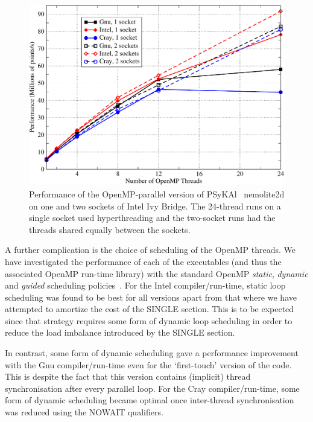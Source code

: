 \documentclass[journal]{IEEEtran}
\newlength{\picwidth}
\newcommand{\psykal}{{PS}y{KA}l\ }
\begin{document}
\begin{figure}
\centering
\includegraphics[width=\picwidth]{1and2sockets}
\caption{Performance of the OpenMP-parallel version of \psykal
  nemolite2d on one and two sockets of Intel Ivy Bridge. The 24-thread
  runs on a single socket used hyperthreading and the two-socket runs
  had the threads shared equally between the sockets.}
\label{FIG_omp_2socks}
\end{figure}

A further complication is the choice of scheduling of the OpenMP
threads.  We have investigated the performance of each of the
executables (and thus the associated OpenMP run-time library) with the
standard OpenMP {\it static}, {\it dynamic} and {\it guided}
scheduling policies~\cite{openmp_standard}. For the Intel
compiler/run-time, static loop scheduling was found to be best for all
versions apart from that where we have attempted to amortize the cost
of the SINGLE section. This is to be expected since that strategy
requires some form of dynamic loop scheduling in order to reduce the
load imbalance introduced by the SINGLE section.

In contrast, some form of dynamic scheduling gave a performance
improvement with the Gnu compiler/run-time even for the `first-touch'
version of the code. This is despite the fact that this version
contains (implicit) thread synchronisation after every parallel loop.
For the Cray compiler/run-time, some form of dynamic scheduling became
optimal once inter-thread synchronisation was reduced using the NOWAIT
qualifiers.


\end{document}

